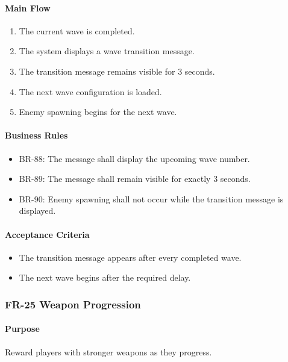 \documentclass[11pt,a4paper]{article}
\begin{document}
\paragraph{Main Flow}
\begin{enumerate}
  \item The current wave is completed.
  \item The system displays a wave transition message.
  \item The transition message remains visible for 3 seconds.
  \item The next wave configuration is loaded.
  \item Enemy spawning begins for the next wave.
\end{enumerate}

\paragraph{Business Rules}
\begin{itemize}
  \item BR-88: The message shall display the upcoming wave number.
  \item BR-89: The message shall remain visible for exactly 3 seconds.
  \item BR-90: Enemy spawning shall not occur while the transition message is
        displayed.
\end{itemize}

\paragraph{Acceptance Criteria}
\begin{itemize}
  \item The transition message appears after every completed wave.
  \item The next wave begins after the required delay.
\end{itemize}

\subsubsection{FR-25 Weapon Progression}

\paragraph{Purpose}
Reward players with stronger weapons as they progress.
\end{document}
